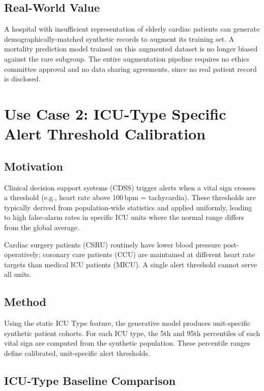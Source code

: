 \documentclass[12pt, a4paper]{article}
\begin{document}
\subsection{Real-World Value}

A hospital with insufficient representation of elderly cardiac patients can
generate demographically-matched synthetic records to augment its training set.
A mortality prediction model trained on this augmented dataset is no longer
biased against the rare subgroup. The entire augmentation pipeline requires
no ethics committee approval and no data sharing agreements, since no real
patient record is disclosed.

\section{Use Case 2: ICU-Type Specific Alert Threshold Calibration}

\subsection{Motivation}

Clinical decision support systems (CDSS) trigger alerts when a vital sign
crosses a threshold (e.g., heart rate above 100\,bpm = tachycardia).
These thresholds are typically derived from population-wide statistics and
applied uniformly, leading to high false-alarm rates in specific ICU units
where the normal range differs from the global average.

Cardiac surgery patients (CSRU) routinely have lower blood pressure post-operatively;
coronary care patients (CCU) are maintained at different heart rate targets
than medical ICU patients (MICU). A single alert threshold cannot serve all units.

\subsection{Method}

Using the static ICU Type feature, the generative model produces unit-specific
synthetic patient cohorts. For each ICU type, the 5th and 95th percentiles
of each vital sign are computed from the synthetic population.
These percentile ranges define calibrated, unit-specific alert thresholds.

\subsection{ICU-Type Baseline Comparison}
\end{document}
